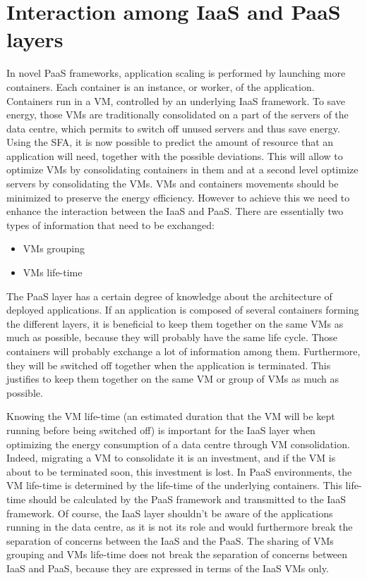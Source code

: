 
\section{Interaction among IaaS and PaaS layers}
\label{sec:iaaspaas}

In novel PaaS frameworks, application scaling is performed by launching more containers.
Each container is an instance, or worker, of the application.
Containers run in a VM, controlled by an underlying IaaS framework.
To save energy, those VMs are traditionally consolidated on a part of the servers of the data centre, which permits to switch off unused servers and thus save energy.
Using the SFA, it is now possible to predict the amount of resource that an application will need, together with the possible deviations.
This will allow to optimize VMs by consolidating containers in them and at a second level optimize servers by consolidating the VMs.
VMs and containers movements should be minimized to preserve the energy efficiency.
However to achieve this we need to enhance the interaction between the IaaS and PaaS.
There are essentially two types of information that need to be exchanged:
\begin{itemize}
  \item VMs grouping
  \item VMs life-time
\end{itemize}

The PaaS layer has a certain degree of knowledge about the architecture of deployed applications.
If an application is composed of several containers forming the different layers, it is beneficial to keep them together on the same VMs as much as possible, because they will probably have the same life cycle.
Those containers will probably exchange a lot of information among them.
Furthermore, they will be switched off together when the application is terminated.
This justifies to keep them together on the same VM or group of VMs as much as possible.

Knowing the VM life-time (an estimated duration that the VM will be kept running before being switched off) is important for the IaaS layer when optimizing the energy consumption of a data centre through VM consolidation.
Indeed, migrating a VM to consolidate it is an investment, and if the VM is about to be terminated soon, this investment is lost.
In PaaS environments, the VM life-time is determined by the life-time of the underlying containers.
This life-time should be calculated by the PaaS framework and transmitted to the IaaS framework.
Of course, the IaaS layer shouldn't be aware of the applications running in the data centre, as it is not its role and would furthermore break the separation of concerns between the IaaS and the PaaS.
The sharing of VMs grouping and VMs life-time does not break the separation of concerns between IaaS and PaaS, because they are expressed in terms of the IaaS VMs only.
